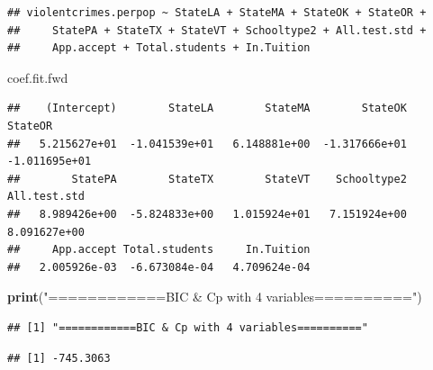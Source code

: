 \documentclass[]{article}
\newenvironment{Shaded}{\begin{snugshade}}{\end{snugshade}}
\newcommand{\KeywordTok}[1]{\textcolor[rgb]{0.13,0.29,0.53}{\textbf{#1}}}
\newcommand{\DecValTok}[1]{\textcolor[rgb]{0.00,0.00,0.81}{#1}}
\newcommand{\StringTok}[1]{\textcolor[rgb]{0.31,0.60,0.02}{#1}}
\newcommand{\CommentTok}[1]{\textcolor[rgb]{0.56,0.35,0.01}{\textit{#1}}}
\newcommand{\OperatorTok}[1]{\textcolor[rgb]{0.81,0.36,0.00}{\textbf{#1}}}
\newcommand{\NormalTok}[1]{#1}
\begin{document}
\begin{verbatim}
## violentcrimes.perpop ~ StateLA + StateMA + StateOK + StateOR + 
##     StatePA + StateTX + StateVT + Schooltype2 + All.test.std + 
##     App.accept + Total.students + In.Tuition
\end{verbatim}

\begin{Shaded}
\begin{Highlighting}[]
\NormalTok{coef.fit.fwd}
\end{Highlighting}
\end{Shaded}

\begin{verbatim}
##    (Intercept)        StateLA        StateMA        StateOK        StateOR 
##   5.215627e+01  -1.041539e+01   6.148881e+00  -1.317666e+01  -1.011695e+01 
##        StatePA        StateTX        StateVT    Schooltype2   All.test.std 
##   8.989426e+00  -5.824833e+00   1.015924e+01   7.151924e+00   8.091627e+00 
##     App.accept Total.students     In.Tuition 
##   2.005926e-03  -6.673084e-04   4.709624e-04
\end{verbatim}

\begin{Shaded}
\begin{Highlighting}[]
\KeywordTok{print}\NormalTok{(}\StringTok{"============BIC & Cp with 4 variables=========="}\NormalTok{)}
\end{Highlighting}
\end{Shaded}

\begin{verbatim}
## [1] "============BIC & Cp with 4 variables=========="
\end{verbatim}

\begin{Shaded}
\end{Shaded}

\begin{verbatim}
## [1] -745.3063
\end{verbatim}

\begin{Shaded}
\end{Shaded}
\end{document}
